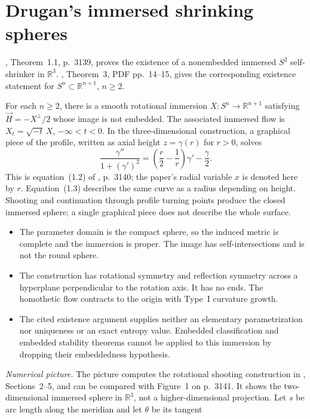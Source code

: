 \chapter{Drugan's immersed shrinking spheres}\label{sec:catalogue-drugan-sphere}
\cite{CatDrugan2015}, Theorem~1.1, p.~3139, proves the existence of a
nonembedded immersed $S^2$ self-shrinker in $\mathbb R^3$.
\cite{CatDLN2018}, Theorem~3, PDF pp.~14--15, gives the corresponding
existence statement for $S^n\subset\mathbb R^{n+1}$, $n\geq2$.

\begin{example}\label{ex:catalogue-drugan-sphere}
For each $n\geq2$, there is a smooth rotational immersion
$X:S^n\to\mathbb R^{n+1}$ satisfying $\vec H=-X^\perp/2$ whose image
is not embedded. The associated immersed flow is
$X_t=\sqrt{-t}\,X$, $-\infty<t<0$.
In the three-dimensional construction, a graphical piece of the profile,
written as axial height $z=\gamma(r)$ for $r>0$, solves
\[
 \frac{\gamma''}{1+(\gamma')^2}
   =\left(\frac r2-\frac1r\right)\gamma'-\frac\gamma2.
\]
This is equation~(1.2) of \cite{CatDrugan2015}, p.~3140; the paper's
radial variable $x$ is denoted here by $r$. Equation~(1.3) describes the
same curve as a radius depending on height.
Shooting and continuation through profile turning points produce the
closed immersed sphere; a single graphical piece does not describe the
whole surface.
\begin{itemize}
\item The parameter domain is the compact sphere, so the induced metric
is complete and the immersion is proper. The image has self-intersections
and is not the round sphere.
\item The construction has rotational symmetry and reflection symmetry
across a hyperplane perpendicular to the rotation axis. It has no ends.
The homothetic flow contracts to the origin with Type~I curvature growth.
\item The cited existence argument supplies neither an elementary
parametrization nor uniqueness or an exact entropy value. Embedded
classification and embedded stability theorems cannot be applied to this
immersion by dropping their embeddedness hypothesis.
\end{itemize}
\emph{Numerical picture.}
The picture computes the rotational shooting construction in
\cite{CatDrugan2015}, Sections~2--5, and can be compared with Figure~1
on p.~3141. It shows the two-dimensional immersed sphere in
$\mathbb R^3$, not a higher-dimensional projection.
Let $s$ be arc length along the meridian and let $\theta$ be its tangent

\end{example}
